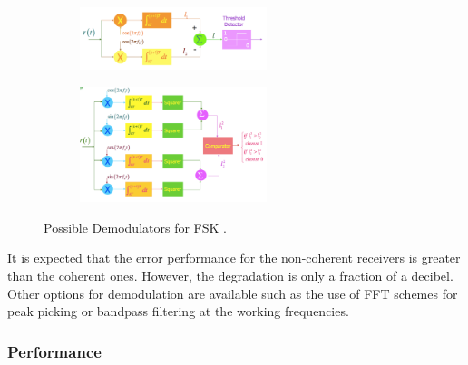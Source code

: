 \documentclass[12pt,a4paper,openright]{report}
\begin{document}
 \begin{figure}[H]
 \centering
\begin{subfigure}[h]{0.9\textwidth}
 \centering
    \includegraphics[width=0.6\textwidth]{fskdem1.pdf}
    \label{fig:FSKdemcoherent}

\end{subfigure}
\quad

\begin{subfigure}[H]{0.9\textwidth}
 \centering
    \includegraphics[width=0.6\textwidth]{fskdem2.pdf}
    \label{fig:FSKdemNoncoherent}
    \end{subfigure}
    \caption[Possible Demodulators for FSK]{Possible Demodulators for FSK \cite{DigModTech}.}
\end{figure}


It is expected that the error performance for the non-coherent receivers is greater than the coherent ones. However, the degradation is only a fraction of a decibel. Other options for demodulation are available such as the use of FFT schemes for peak picking or bandpass filtering at the working frequencies.

 \subsubsection{Performance}
 
\end{document}
